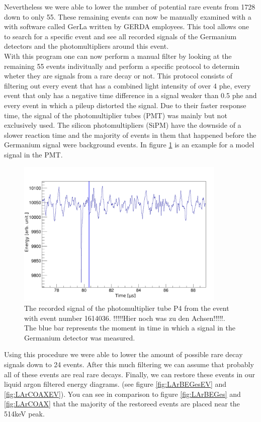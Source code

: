 Nevertheless we were able to lower the number of potential rare  events from 1728 down to only 55.  
These remaining events can now be manually examined with a with software called GerLa written by GERDA employees.
This tool allows one to search for a specific event and see all recorded signals of the Germanium detectors and the photomultipliers around this event.
\\

With this program one can now perform a manual filter by looking at the remaining 55 events indivitually and perform a specific protocol to determin wheter they are signals from a rare  decay or not.
This protocol consists of filtering out every event that has a combined light intensity of over 4 phe, every event that only has a negative time difference in a signal weaker than 0.5 phe and every event in which a pileup distorted the signal.
Due to their faster response time, the signal of the photomultiplier tubes (PMT) was mainly but not exclusively used.
The silicon photomultipliers (SiPM) have the downside of a slower reaction time and the majority of events in them that happened before the Germanium signal were background events.
In figure \ref{fig:Trigger4} is an example for a model signal in the PMT.
\\

\begin{figure}[t!]
	\centering
	\ifmakefigures%
	\includegraphics[width=100mm]{./Bilder/BeispielSignal.png}
	\fi%
	\caption{\label{fig:Trigger4}
    The recorded signal of the photomultiplier tube P4 from the event with event number 1614036. !!!!!Hier noch was zu den Achsen!!!!!. 
    The blue bar represents the moment in time in which a signal in the Germanium detector was measured.
	}
\end{figure}

Using this procedure we were able to lower the amount of possible rare  decay signals down to 24 events.
After this much filtering we can assume that probably all of these events are real rare  decays.
Finally, we can restore these events in our liquid argon filtered energy diagrams. (see figure \ref{fig:LArBEGesEV} and \ref{fig:LArCOAXEV}).
You can see in comparison to figure \ref{fig:LArBEGes} and \ref{fig:LArCOAX} that the majority of the restoreed events are placed near the 514keV peak.
\\

